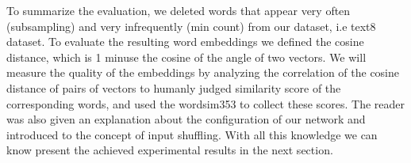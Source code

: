 To summarize the evaluation, we deleted words that appear very often (subsampling) and very infrequently (min count) from our dataset, i.e text8 dataset. To evaluate the resulting word embeddings we defined the cosine distance, which is 1 minuse the cosine of the angle of two vectors. We will measure the quality of the embeddings by analyzing the correlation of the cosine distance of pairs of vectors to humanly judged similarity score of the corresponding words, and used the wordsim353 to collect these scores. The reader was also given an explanation about the configuration of our network and introduced to the concept of input shuffling. With all this knowledge we can know present the achieved experimental results in the next section.
